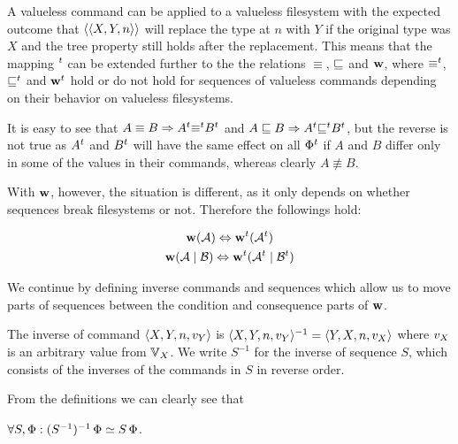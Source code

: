 A valueless command can be applied to a valueless filesystem with the expected outcome
that $\langle\langle{X,Y,n}\rangle\rangle$ will replace the type at $n$ with $Y$ 
if the original type was $X$ and the tree property still holds after the replacement.
This means that
the mapping ${}^t$ can be extended further to the 
the relations $\equiv$, $\sqsubseteq$ and $\mathbf{w}$, where
${\equiv}{}^t$, ${\sqsubseteq}{}^t$ and $\mathbf{w}{}^t$ hold or do not hold for sequences of valueless commands
depending on their behavior on valueless filesystems.

It is easy to see that 
$A\equiv B \Rightarrow A{}^t{\equiv}{}^t B{}^t$ 
and
$A\sqsubseteq B \Rightarrow A{}^t{\sqsubseteq}{}^t B{}^t$,
but the reverse is not true as 
$A{}^t$ and $B{}^t$ will have the same effect on all $\Phi{}^t$
if $A$ and $B$ differ only in some of the values in their commands,
whereas clearly $A\nequiv B$.

With $\mathbf{w}$, however, the situation is different, as it only
depends on whether sequences break filesystems or not. Therefore the followings hold:
\begin{mycor}
\begin{gather*}
\mathbf{w}({\mathcal{A}}) \Leftrightarrow \mathbf{w}{}^t({\mathcal{A}{}^t}) \\
\mathbf{w}({\mathcal{A}}\mathrel{|}{\mathcal{B}}) \Leftrightarrow \mathbf{w}{}^t({\mathcal{A}{}^t}\mathrel{|}{\mathcal{B}{}^t})
\end{gather*}
\end{mycor}


We continue by defining inverse commands and sequences
which allow us to move parts of sequences between the
condition and consequence parts of $\mathbf{w}$.

\begin{mydef}
The inverse of command $\langle{X,Y,n,v_Y}\rangle$ is $\langle{X,Y,n,v_Y}\rangle^{-1} = \langle{Y,X,n,v_X}\rangle$
where $v_X$ is an arbitrary value from $\mathbb{V}_{X}$.
We write $S^{-1}$ for the inverse of sequence $S$, which consists of the inverses of the commands in $S$
in reverse order.
\end{mydef}


From the definitions we can clearly see that
\begin{mycor}\label{negneg_is_typeeq}
$\forall S, \Phi: (S^{-1})^{-1}\,\Phi\simeq S\,\Phi$.
\end{mycor}

